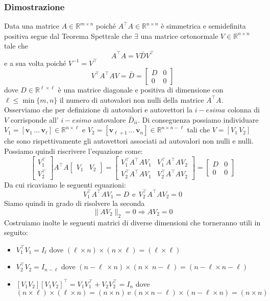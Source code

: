 \documentclass[11pt]{article}
\newcommand{\R}{\mathbb{R}} %
\begin{document}
\subsubsection{Dimostrazione}
Data una matrice $A \in \R^{m \times n}$ poiché $A^\top      A \in \R^{n \times n}$ è simmetrica e semidefinita positiva segue dal Teorema Spettrale che $\exists$ una matrice ortonormale $V \in \R^{n \times n}$ tale che $$ A^\top      A=V\bar{D}V^\top      $$ e a sua volta poiché $V^{-1}=V^\top      $ $$V^\top      A^\top      AV=\bar{D}= \begin{bmatrix}D & 0 \\ 0 & 0\end{bmatrix}$$
dove $D \in \R^{\ell \times \ell}$ è una matrice diagonale e positiva di dimensione con $\ell \leq \min{\{m,n\}}$ il numero di autovalori non nulli della matrice $A^\top      A$. 
Osserviamo che per definizione di autovalori e autovettori la $i-esima$ colonna di $V$ corrisponde all' $i-esimo$ autovalore $\bar{D}_{ii}$. Di conseguenza possiamo individuare $V_1=[\mathbf{v}_1 \, \dots \, \mathbf{v}_{\ell}] \in \R^{n \times \ell}$ e $V_2=[\mathbf{v}_{\ell+1} \, \dots \, \mathbf{v}_n] \in \R^{n \times n-\ell}$ tali che $V=[V_1 \, V_2]$ che sono rispettivamente gli autovettori associati ad autovalori non nulli e nulli. 
Possiamo quindi riscrivere l'equazione come:
$$ \begin{bmatrix} V_1^\top       \\ V_2^\top       \end{bmatrix}
A^\top      A \begin{bmatrix} V_1 & \!\! V_2 \end{bmatrix}
= \begin{bmatrix}  V_1^\top      A^\top      AV_1 & V_1^\top      A^\top      AV_2 \\
  V_2^\top      A^\top      AV_1 & V_2^\top      A^\top      AV_2
\end{bmatrix} = \begin{bmatrix} D & 0 \\ 0 & 0 \end{bmatrix}$$
Da cui ricaviamo le seguenti equazioni:
$$V_1^\top      A^\top      AV_1=D \ \ \text{e} \ \ V_2^\top      A^\top      AV_2=0$$ 
Siamo quindi in grado di risolvere la seconda
$$\|AV_2\|_2=0 \Rightarrow AV_2=0$$ 
Costruiamo inolte le seguenti matrici di diverse dimensioni che torneranno utili in seguito:\\
\begin{itemize}
	\item$V_1^\top      V_1=I_{\ell}$ dove $(\ell \times n)\times(n \times \ell)=(\ell \times \ell)$
	\item$V_2^\top      V_2=I_{n-\ell}$ dove $(n-\ell \ \times n)\times(n \times \ n-\ell)=(n-\ell \times n-\ell)$
	\item$[V_1 V_2][V_1 V_2]^\top      =V_1V_1^\top      +V_2V_2^\top      =I_n$ dove\\
 	$$(n \times \ell)\times(\ell \times n)=(n \times n) \ \text{e} \ (n \times n-\ell)\times(n-\ell \times  n)=(n \times n)$$
\end{itemize}
\end{document}
